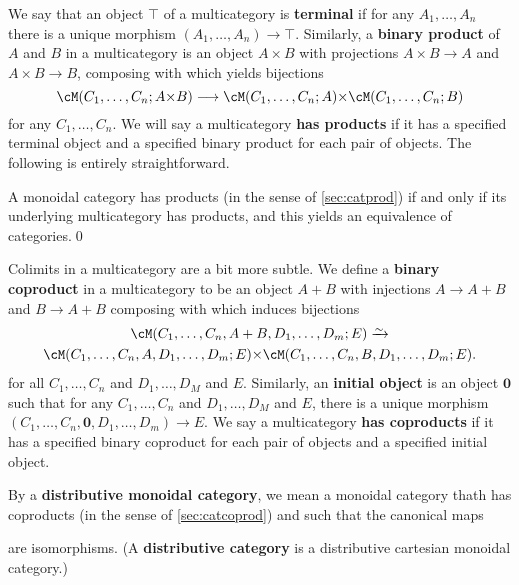 \documentclass{book}
\def\unit{\top}%
\def\zero{\mathbf{0}}
\let\tensor\otimes
\begin{document}
We say that an object $\unit$ of a multicategory is \textbf{terminal} if for any $A_1,\dots, A_n$ there is a unique morphism $(A_1,\dots, A_n)\to \unit$.
Similarly, a \textbf{binary product} of $A$ and $B$ in a multicategory is an object $A\times B$ with projections $A\times B \to A$ and $A\times B\to B$, composing with which yields bijections
\[ \cM(C_1,\dots,C_n;A\times B) \too \cM(C_1,\dots,C_n;A) \times \cM(C_1,\dots,C_n;B)\]
for any $C_1,\dots,C_n$.
We will say a multicategory \textbf{has products} if it has a specified terminal object and a specified binary product for each pair of objects.
The following is entirely straightforward.

\begin{thm}\label{thm:multicat-prod}
  A monoidal category has products (in the sense of \cref{sec:catprod}) if and only if its underlying multicategory has products, and this yields an equivalence of categories.\qed
\end{thm}

Colimits in a multicategory are a bit more subtle.
We define a \textbf{binary coproduct} in a multicategory \cM to be an object $A+B$ with injections $A\to A+B$ and $B\to A+B$ composing with which induces bijections
\begin{multline*}
  \cM(C_1,\dots,C_n,A+B,D_1,\dots,D_m;E) \toiso\\
  \cM(C_1,\dots,C_n,A,D_1,\dots,D_m;E) \times \cM(C_1,\dots,C_n,B,D_1,\dots,D_m;E).
\end{multline*}
for all $C_1,\dots,C_n$ and $D_1,\dots, D_M$ and $E$.
Similarly, an \textbf{initial object} is an object $\zero$ such that for any $C_1,\dots,C_n$ and $D_1,\dots, D_M$ and $E$, there is a unique morphism $(C_1,\dots,C_n,\zero,D_1,\dots,D_m)\to E$.
We say a multicategory \textbf{has coproducts} if it has a specified binary coproduct for each pair of objects and a specified initial object.

By a \textbf{distributive monoidal category}, we mean a monoidal category thath has coproducts (in the sense of \cref{sec:catcoprod}) and such that the canonical maps
are isomorphisms.
(A \textbf{distributive category} is a distributive cartesian monoidal category.)
\end{document}
